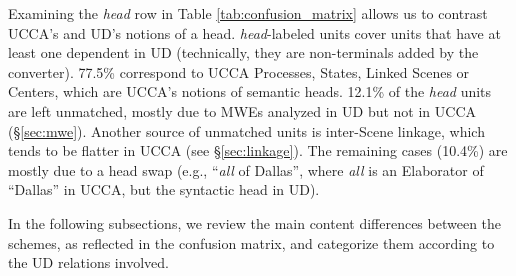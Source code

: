 \documentclass[11pt,a4paper]{article}
\begin{document}
Examining the {\it head} row in Table \ref{tab:confusion_matrix} allows
us to contrast UCCA's and UD's notions of a head. 
{\it head}-labeled units cover units that have at least
one dependent in UD (technically, they are non-terminals added by the converter).
77.5\% correspond to UCCA Processes, States, Linked Scenes or Centers,
which are UCCA's notions of semantic heads.
12.1\% of the {\it head} units are left unmatched, mostly due to MWEs analyzed in
UD but not in UCCA (\S\ref{sec:mwe}).
Another source of unmatched units is inter-Scene linkage, which tends to be flatter in
UCCA (see \S\ref{sec:linkage}).
The remaining cases (10.4\%) are mostly due to a head swap (e.g., ``\textit{all} of Dallas'', where \textit{all} 
is an Elaborator of ``Dallas'' in UCCA, but the syntactic head in UD).

In the following subsections, we review the main content differences between the schemes,
as reflected in the confusion matrix, and categorize them according to the UD relations
involved.
\end{document}
